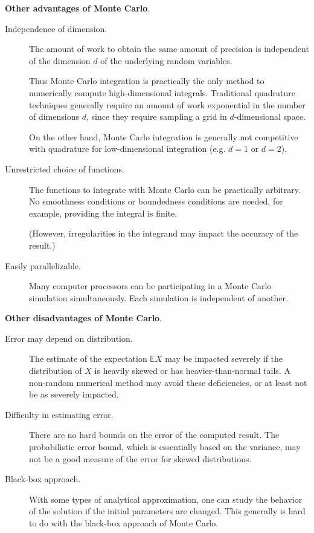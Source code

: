\documentclass[12pt]{article}
\newcommand{\E}{\mathbb{E}}
\begin{document}
\textbf{Other advantages of Monte Carlo}.
\begin{description}
\item[Independence of dimension.]
The amount of work to obtain the same amount of precision
is independent of the dimension $d$ 
of the underlying random variables.

Thus Monte Carlo integration is practically the only method
to numerically compute high-dimensional integrals.  Traditional
quadrature techniques generally require an amount of work
exponential in the number of dimensions $d$,
since they require sampling a grid in $d$-dimensional space.

On the other hand, Monte Carlo integration is generally
not competitive with quadrature for low-dimensional integration
(e.g. $d=1$ or $d=2$).

\item[Unrestricted choice of functions.]
The functions to integrate with Monte Carlo 
can be practically arbitrary.
No smoothness conditions or boundedness conditions are needed,
for example, providing the integral is finite.

(However, irregularities in the integrand
may impact the accuracy of the result.)

\item[Easily parallelizable.]
Many computer processors can be participating 
in a Monte Carlo simulation simultaneously.  
Each simulation is independent of another.
\end{description}

\textbf{Other disadvantages of Monte Carlo}.
\begin{description}
\item[Error may depend on distribution.]
The estimate of the expectation $\E X$ may be impacted 
severely if the distribution of $X$ is heavily skewed
or has heavier-than-normal tails.
A non-random numerical method
may avoid these deficiencies,
or at least not be as severely impacted.

\item[Difficulty in estimating error.]
There are no hard bounds on the error of the computed result.
The probabilistic error bound, which is essentially based on the
variance, may not be a good measure
of the error for skewed distributions.

\item[Black-box approach.]
With some types of analytical approximation,
one can study the behavior of the solution
if the initial parameters are changed.
This generally is hard to do with 
the black-box approach of Monte Carlo.
\end{description}
\end{document}
